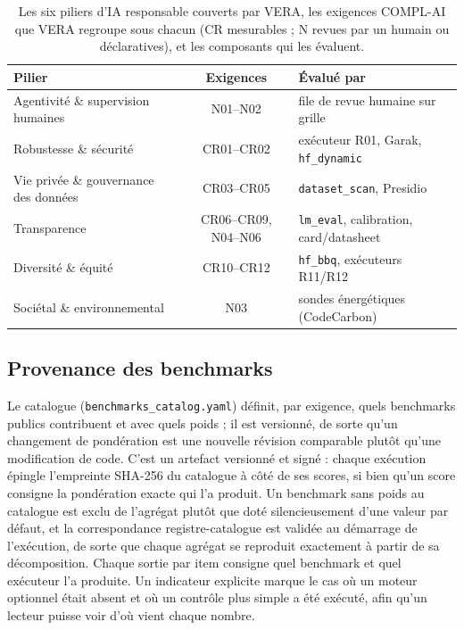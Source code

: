 \documentclass[10pt,conference]{IEEEtran}
\newcommand{\tblsetup}{%
  \footnotesize%
  \setlength{\tabcolsep}{3pt}%
  \renewcommand{\arraystretch}{1.02}%
}
\begin{document}
\begin{table}[t]
  \caption{Les six piliers d'IA responsable couverts par VERA, les exigences COMPL-AI que VERA regroupe sous chacun (CR mesurables ; N revues par un humain ou déclaratives), et les composants qui les évaluent.}
  \label{tab:pillars}
  \centering
  \tblsetup
  \begin{tabularx}{\columnwidth}{@{}lcX@{}}
    \toprule
    Pilier & Exigences & Évalué par \\
    \midrule
    Agentivité \& supervision humaines & N01--N02 & file de revue humaine sur grille \\
    Robustesse \& sécurité & CR01--CR02 & exécuteur R01, Garak, \texttt{hf\_dynamic} \\
    Vie privée \& gouvernance des données & CR03--CR05 & \texttt{dataset\_scan}, Presidio \\
    Transparence & CR06--CR09, N04--N06 & \texttt{lm\_eval}, calibration, card/datasheet \\
    Diversité \& équité & CR10--CR12 & \texttt{hf\_bbq}, exécuteurs R11/R12 \\
    Sociétal \& environnemental & N03 & sondes énergétiques (CodeCarbon) \\
    \bottomrule
  \end{tabularx}
\end{table}

\subsection{Provenance des benchmarks}
Le catalogue (\texttt{benchmarks\_catalog.yaml}) définit, par exigence, quels benchmarks publics contribuent et avec quels poids ; il est versionné, de sorte qu'un changement de pondération est une nouvelle révision comparable plutôt qu'une modification de code.
C'est un artefact versionné et signé : chaque exécution épingle l'empreinte SHA-256 du catalogue à côté de ses scores, si bien qu'un score consigne la pondération exacte qui l'a produit.
Un benchmark sans poids au catalogue est exclu de l'agrégat plutôt que doté silencieusement d'une valeur par défaut, et la correspondance registre-catalogue est validée au démarrage de l'exécution, de sorte que chaque agrégat se reproduit exactement à partir de sa décomposition.
Chaque sortie par item consigne quel benchmark et quel exécuteur l'a produite.
Un indicateur explicite marque le cas où un moteur optionnel était absent et où un contrôle plus simple a été exécuté, afin qu'un lecteur puisse voir d'où vient chaque nombre.
\end{document}
